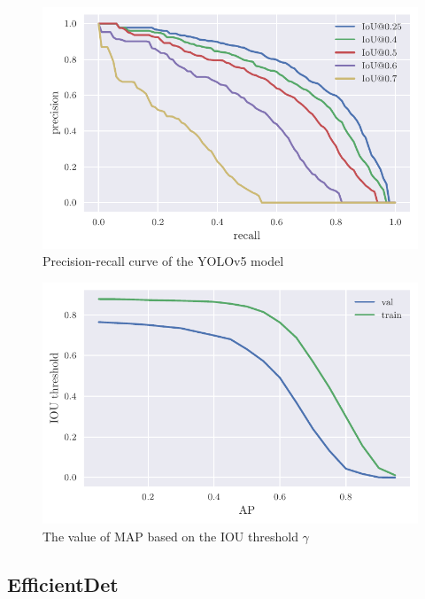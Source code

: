 \begin{paracol}{2}
    \begin{figure}
        \includegraphics[width=\linewidth]{images/iou_val_multiple.pdf}
        \caption{Precision-recall curve of the YOLOv5 model}
        \label{fig:yolov5_pr_curves}
    \end{figure}
    \switchcolumn
    \begin{figure}
        \includegraphics[width=\linewidth]{images/iou_threshold.pdf}
        \caption{The value of MAP based on the IOU threshold $\gamma$}
        \label{fig:yolov5_map_iou_thresholds}
    \end{figure}
\end{paracol}

\subsection{EfficientDet}


